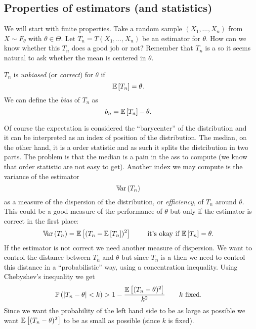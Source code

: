 \documentclass[12pt]{report}
\begin{document}
\subsection{Properties of estimators (and statistics)}
We will start with finite properties. Take a random sample $(X_{1},\ldots,X_{n})$ from $X\sim F_{\theta}$ with $\theta\in\Theta$. Let $T_{n}=T(X_{1},\ldots,X_{n})$ be an estimator for $\theta$. How can we know whether this $T_{n}$ does a good job or not? Remember that $T_{n}$ is a \rv{} so it seems natural to ask whether the mean is centered in $\theta$.
\begin{definition}
	$T_{n}$ is \emph{unbiased} (or \emph{correct}) for $\theta$ if 
	\begin{equation*}
		\mathbb{E}\left[T_{n}\right]=\theta.
	\end{equation*}
	We can define the \emph{bias} of $T_{n}$ as
	\begin{equation*}
		b_{n}=\mathbb{E}\left[T_{n}\right]-\theta.
	\end{equation*}
\end{definition}
Of course the expectation is considered the ``barycenter'' of the distribution and it can be interpreted as an index of position of the distribution. The median, on the other hand, it is a order statistic and as such it splits the distribution in two parts. The problem is that the median is a pain in the ass to compute (we know that order statistic are not easy to get). Another index we may compute is the variance of the estimator
\begin{equation*}
	\mathbb{V}\!\mathrm{ar}\,(T_{n}) 
\end{equation*}
as a measure of the dispersion of the distribution, or \emph{efficiency}, of $T_{n}$ around $\theta$. This could be a good measure of the performance of $\theta$ but only if the estimator is correct in the first place:
\begin{equation*}
	\mathbb{V}\!\mathrm{ar}\,(T_{n})=\mathbb{E}\left[(T_{n}-\mathbb{E}\left[T_{n}\right])^{2}\right]\qquad\text{ it's okay if $\mathbb{E}\left[T_{n}\right]=\theta$}.
\end{equation*}
If the estimator is not correct we need another measure of dispersion. We want to control the distance between $T_{n}$ and $\theta$ but since $T_{n}$ is a \rv{} then we need to control this distance in a ``probabilistic'' way, using a concentration inequality. Using Chebyshev's inequality we get
\begin{equation*}
	\mathbb{P}\left(|T_{n}-\theta|<k\right)>1-\frac{\mathbb{E}\left[(T_{n}-\theta)^{2}\right]}{k^{2}}\qquad\text{$k$ fixed}.
\end{equation*}
Since we want the probability of the left hand side to be as large as possible we want $\mathbb{E}\left[(T_{n}-\theta)^{2}\right]$ to be as small as possible (since $k$ is fixed). 
\end{document}
